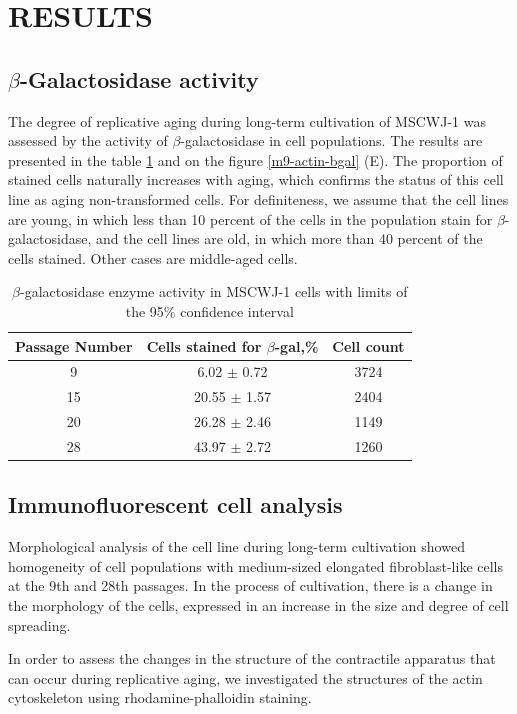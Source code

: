 \documentclass[english,authoryear]{elsarticle}
\begin{document}
\section{RESULTS}

\subsection{$\beta$-Galactosidase activity}


The degree of replicative aging during long-term cultivation of MSCWJ-1 was assessed by the activity of $\beta$-galactosidase in cell populations.
The results are presented in the table \ref{tab} and on the figure \ref{m9-actin-bgal} (E).
The proportion of stained cells naturally increases with aging, which confirms the status of this cell line as aging non-transformed cells.
For definiteness, we assume that  the cell lines are young, in which less than 10 percent of the cells in the population stain for $\beta$-galactosidase, and
the cell lines are old, in which more than 40 percent of the cells stained. Other cases are middle-aged cells.


\begin{table}[hb]
  \caption{$\beta$-galactosidase enzyme activity in MSCWJ-1 cells with limits of the 95\% confidence interval}
  \label{tab}
\centering
\begin{tabular}{c|c|c}
 Passage Number & Cells stained for $\beta$-gal,\% & Cell count  \\
 \hline
 9 & 6.02 $\pm$ 0.72 & 3724 \\
 15 & 20.55 $\pm$ 1.57 & 2404 \\
 20 & 26.28 $\pm$ 2.46 & 1149  \\
 28 & 43.97 $\pm$ 2.72 & 1260

\end{tabular}
\end{table}

\subsection{Immunofluorescent cell analysis}

Morphological analysis of the cell line during long-term cultivation showed homogeneity of cell populations with medium-sized elongated fibroblast-like cells at the 9th and 28th passages.
In the process of cultivation, there is a change in the morphology of the cells, expressed in an increase in the size and degree of cell spreading.

In order to assess the changes in the structure of the contractile apparatus that can occur during replicative aging, we investigated the structures of the actin cytoskeleton using rhodamine-phalloidin staining.
\end{document}
